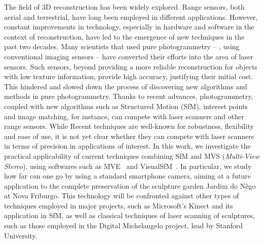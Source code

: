 \documentclass[a4paper,12pt,oneside,onecolumn,final,fleqn]{repUERJ}
\theoremstyle{plain}
\theoremstyle{definition}
\newcounter{ct}
\begin{document}
The field of 3D reconstruction has been widely explored. Range sensors, both aerial
and terrestrial, have long been employed in different applications. However, constant
improvements in technology, especially in hardware and software in the context
of reconstruction, have led to the emergence of new techniques in the past two decades.
Many scientists that used pure photogrammetry -- \ie, using conventional
imaging sensors -- have converted their efforts into the area of laser sensors.
Such sensors, beyond providing a more reliable reconstruction for
objects with low texture information, provide high accuracy, justifying their
initial cost.  This hindered and slowed down the process of discovering new algorithms
and methods in pure photogrammetry.
Thanks to recent advances, photogrammetry, coupled with new algorithms
such as Structured Motion (SfM), interest points and image matching, for instance,
can compete with laser scanners and other range sensors. While Recent techniques are well-known for robustness, flexibility and ease of use, it is not yet clear whether they can compete with laser scanners in terms of precision in applications of interest.
In this work, we investigate the practical applicability of current techniques
combining SfM and MVS (\emph{Multi-View Stereo}), using softwares such as
MVE~\cite{mve} and VisualSfM~\cite{wu2011visualsfm}. In particular, we study
how far can one go by using a standard smartphone camera, aiming at a future application to the complete preservation of the sculpture garden Jardim do Nêgo at Nova Friburgo. 
This technology will be confronted against other types of techniques employed in
major projects, such as Microsoft's Kinect and its application in SfM, as well as
classical techniques of laser scanning of sculptures, such as those employed in
the Digital Michelangelo project, lead by Stanford University.
\onehalfspacing

\printkeys


\listadefiguras
\listadetabelas
\listadealgoritmos


\end{document}
